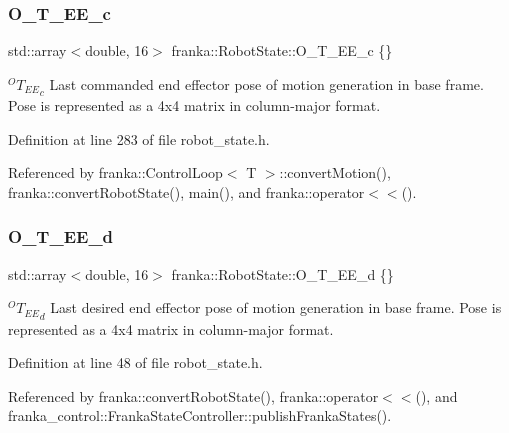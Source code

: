 \mbox{\label{structfranka_1_1RobotState_a395c48eff099419ea5d42eaf0870fc18}} 
\subsubsection{\texorpdfstring{O\+\_\+\+T\+\_\+\+E\+E\+\_\+c}{O\_T\_EE\_c}}
{\footnotesize\ttfamily std\+::array$<$double, 16$>$ franka\+::\+Robot\+State\+::\+O\+\_\+\+T\+\_\+\+E\+E\+\_\+c \{\}}

${^OT_{EE}}_{c}$ Last commanded end effector pose of motion generation in base frame. Pose is represented as a 4x4 matrix in column-\/major format. 

Definition at line 283 of file robot\+\_\+state.\+h.



Referenced by franka\+::\+Control\+Loop$<$ T $>$\+::convert\+Motion(), franka\+::convert\+Robot\+State(), main(), and franka\+::operator$<$$<$().

\mbox{\label{structfranka_1_1RobotState_a3e5b4b7687856e92d826044be7d15733}} 
\subsubsection{\texorpdfstring{O\+\_\+\+T\+\_\+\+E\+E\+\_\+d}{O\_T\_EE\_d}}
{\footnotesize\ttfamily std\+::array$<$double, 16$>$ franka\+::\+Robot\+State\+::\+O\+\_\+\+T\+\_\+\+E\+E\+\_\+d \{\}}

${^OT_{EE}}_{d}$ Last desired end effector pose of motion generation in base frame. Pose is represented as a 4x4 matrix in column-\/major format. 

Definition at line 48 of file robot\+\_\+state.\+h.



Referenced by franka\+::convert\+Robot\+State(), franka\+::operator$<$$<$(), and franka\+\_\+control\+::\+Franka\+State\+Controller\+::publish\+Franka\+States().

